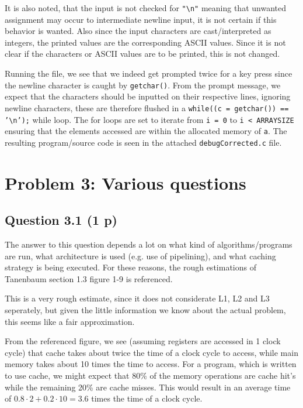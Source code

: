 \documentclass{article}
\begin{document}
It is also noted, that the input is not checked for \texttt{"\textbackslash n"} meaning that unwanted assignment may occur to intermediate newline input, it is not certain if this behavior is wanted. Also since the input characters are cast/interpreted as integers, the printed values are the corresponding ASCII values. Since it is not clear if the characters or ASCII values are to be printed, this is not changed. 

Running the file, we see that we indeed get prompted twice for a key press since the newline character is caught by \texttt{getchar()}. From the prompt message, we expect that the characters should be inputted on their respective lines, ignoring newline characters, these are therefore flushed in a \texttt{while((c = getchar()) == '\textbackslash n');} while loop. The for loops are set to iterate from \texttt{i = 0} to \texttt{i < ARRAYSIZE} ensuring that the elements accessed are within the allocated memory of \texttt{a}. The resulting program/source code is seen in the attached \texttt{debugCorrected.c} file.

\section{Problem 3: Various questions}
\subsection{Question 3.1 (1 p)}

The answer to this question depends a lot on what kind of algorithms/programs are run, what architecture is used (e.g. use of pipelining), and what caching strategy is being executed. For these reasons, the rough estimations of Tanenbaum\cite{tanenbaum} section 1.3 figure 1-9 is referenced. 

This is a very rough estimate, since it does not considerate L1, L2 and L3 seperately, but given the little information we know about the actual problem, this seems like a fair approximation.

From the referenced figure, we see (assuming registers are accessed in 1 clock cycle) that cache takes about twice the time of a clock cycle to access, while main memory takes about 10 times the time to access. For a program, which is written to use cache, we might expect that 80\% of the memory operations are cache hit's while the remaining 20\% are cache misses. This would result in an average time of $0.8\cdot2 + 0.2\cdot10 = 3.6$ times the time of a clock cycle.
\end{document}

